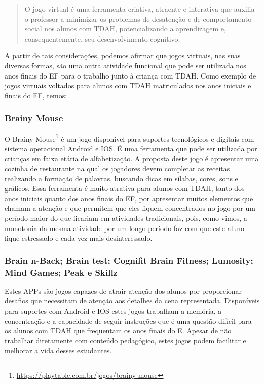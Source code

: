 \documentclass{textolivre}
\begin{document}
\begin{quote}
    O jogo virtual é uma ferramenta criativa, atraente e interativa que auxilia o professor a minimizar os problemas de desatenção e de comportamento social nos alunos com TDAH, potencializando a aprendizagem e, consequentemente, seu desenvolvimento cognitivo.
\end{quote}

A partir de tais considerações, podemos afirmar que jogos virtuais, nas suas diversas formas, são uma outra atividade funcional que pode ser utilizada nos anos finais do EF para o trabalho junto à criança com TDAH. Como exemplo de jogos virtuais voltados para alunos com TDAH matriculados nos anos iniciais e finais do EF, temos:

\subsubsection{Brainy Mouse}\label{sec-brainy}
O Brainy Mouse\footnote{\url{https://playtable.com.br/jogos/brainy-mouse}} é um jogo disponível para suportes tecnológicos e digitais com sistema operacional Android e IOS. É uma ferramenta que pode ser utilizada por crianças em faixa etária de alfabetização. A proposta deste jogo é apresentar uma cozinha de restaurante na qual os jogadores devem completar as receitas realizando a formação de palavras, buscando dicas em sílabas, cores, sons e gráficos. Essa ferramenta é muito atrativa para alunos com TDAH, tanto dos anos iniciais quanto dos anos finais do EF, por apresentar muitos elementos que chamam a atenção e que permitem que eles fiquem concentrados no jogo por um período maior do que ficariam em atividades tradicionais, pois, como vimos, a monotonia da mesma atividade por um longo período faz com que este aluno fique estressado e cada vez mais desinteressado.

\subsubsection{Brain n-Back; Brain test; Cognifit Brain Fitness; Lumosity; Mind Games; Peak e Skillz}\label{sec-brainn}
Estes APPs são jogos capazes de atrair atenção dos alunos por proporcionar desafios que necessitam de atenção aos detalhes da cena representada. Disponíveis para suportes com Android e IOS estes jogos trabalham a memória, a concentração e a capacidade de seguir instruções que é uma questão difícil para os alunos com TDAH que frequentam os anos finais do E. Apesar de não trabalhar diretamente com conteúdo pedagógico, estes jogos podem facilitar e melhorar a vida desses estudantes.
\end{document}

